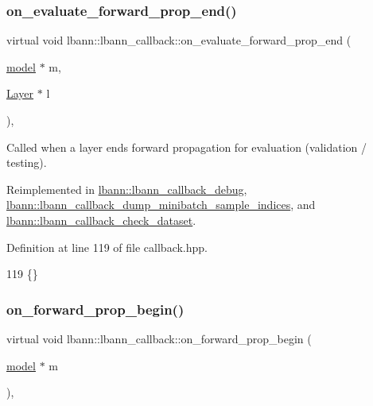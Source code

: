 \subsubsection{\texorpdfstring{on\+\_\+evaluate\+\_\+forward\+\_\+prop\+\_\+end()}{on\_evaluate\_forward\_prop\_end()}\hspace{0.1cm}{\footnotesize\ttfamily [2/2]}}
{\footnotesize\ttfamily virtual void lbann\+::lbann\+\_\+callback\+::on\+\_\+evaluate\+\_\+forward\+\_\+prop\+\_\+end (\begin{DoxyParamCaption}\item[{\hyperlink{classlbann_1_1model}{model} $\ast$}]{m,  }\item[{\hyperlink{classlbann_1_1Layer}{Layer} $\ast$}]{l }\end{DoxyParamCaption})\hspace{0.3cm}{\ttfamily [inline]}, {\ttfamily [virtual]}}

Called when a layer ends forward propagation for evaluation (validation / testing). 

Reimplemented in \hyperlink{classlbann_1_1lbann__callback__debug_a19639823e288e7599947c0abfaa6d1f4}{lbann\+::lbann\+\_\+callback\+\_\+debug}, \hyperlink{classlbann_1_1lbann__callback__dump__minibatch__sample__indices_acb641b979a37cc703994103a4e8428a5}{lbann\+::lbann\+\_\+callback\+\_\+dump\+\_\+minibatch\+\_\+sample\+\_\+indices}, and \hyperlink{classlbann_1_1lbann__callback__check__dataset_a1223f07081d495d971cdf205f892c50d}{lbann\+::lbann\+\_\+callback\+\_\+check\+\_\+dataset}.



Definition at line 119 of file callback.\+hpp.


\begin{DoxyCode}
119 \{\}
\end{DoxyCode}
\mbox{\label{classlbann_1_1lbann__callback_a22ed977371173105b4aad3a20b9c59dc}} 
\subsubsection{\texorpdfstring{on\+\_\+forward\+\_\+prop\+\_\+begin()}{on\_forward\_prop\_begin()}\hspace{0.1cm}{\footnotesize\ttfamily [1/2]}}
{\footnotesize\ttfamily virtual void lbann\+::lbann\+\_\+callback\+::on\+\_\+forward\+\_\+prop\+\_\+begin (\begin{DoxyParamCaption}\item[{\hyperlink{classlbann_1_1model}{model} $\ast$}]{m }\end{DoxyParamCaption})\hspace{0.3cm}{\ttfamily [inline]}, {\ttfamily [virtual]}}

